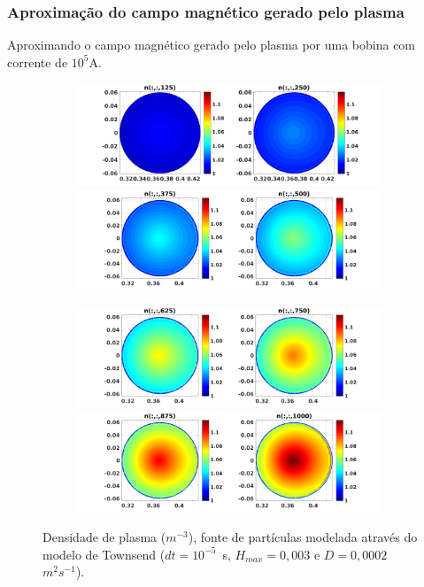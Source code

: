 

\begin{frame}		
\frametitle{Aproximação do campo magnético gerado pelo plasma }
Aproximando o campo magnético gerado pelo plasma por uma bobina com corrente de $10^5$A.
\begin{figure}[H]
\begin{subfigure}{0.43\textwidth}
\includegraphics[scale=0.24]{../SImulacao_breakdown/PDE/ntod1B9.png}  
\includegraphics[scale=0.24]{../SImulacao_breakdown/PDE/ntod2B9.png}
\end{subfigure}
\begin{subfigure}{0.43\textwidth}
\includegraphics[scale=0.24]{../SImulacao_breakdown/PDE/ntod3B9.png} 
\includegraphics[scale=0.24]{../SImulacao_breakdown/PDE/ntod4B9.png} 
\end{subfigure}
\caption{Densidade de plasma ($m^{-3}$), fonte de partículas modelada através do modelo de Townsend ($dt=10^{-5}$\ s, $H_{max} = 0,003$ e $D=0,0002$\ $m^2s^{-1}$).}
\label{campplasmasil1}
\end{figure}
\end{frame}

